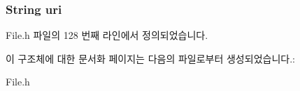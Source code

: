 \hypertarget{struct___audio_extends_ac0b02717b928a36338653c49b0821365}{
\subsubsection[{uri}]{\setlength{\rightskip}{0pt plus 5cm}String uri}}\label{struct___audio_extends_ac0b02717b928a36338653c49b0821365}


File.\-h 파일의 128 번째 라인에서 정의되었습니다.



이 구조체에 대한 문서화 페이지는 다음의 파일로부터 생성되었습니다.\-:\begin{DoxyCompactItemize}
\item 
File.\-h\end{DoxyCompactItemize}
